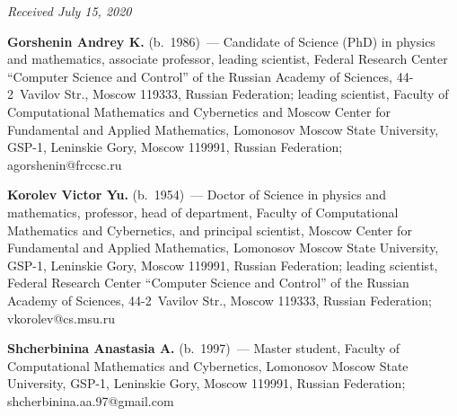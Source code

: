 \hfill{\small\textit{Received July 15, 2020}}



\Contr

\noindent
\textbf{Gorshenin Andrey K.} (b.\ 1986)~--- 
Candidate of Science (PhD) in physics and
mathematics, associate professor, leading scientist, Federal 
Research Center ``Computer Science and Control'' of the Russian 
Academy of Sciences, 44-2~Vavilov Str., Moscow 119333, Russian Federation; 
leading scientist, Faculty of Computational Mathematics and Cybernetics 
and Moscow Center for Fundamental and Applied Mathematics, Lomonosov 
Moscow State University, GSP-1, Leninskie Gory, Moscow 119991, 
Russian Federation; \mbox{agorshenin@frccsc.ru}

\vspace*{3pt}

\noindent
\textbf{Korolev Victor Yu.} (b.\ 1954)~--- 
Doctor of Science in physics and
mathematics, professor, head of department, Faculty of Computational 
Mathematics and Cybernetics, and principal scientist, 
Moscow Center for Fundamental and Applied Mathematics, 
Lomonosov Moscow State University, GSP-1, Leninskie Gory, Moscow 
119991, Russian Federation; leading scientist, Federal Research Center 
``Computer Science and Control'' of the Russian Academy of Sciences, 
44-2~Vavilov Str., Moscow 119333, Russian Federation; \mbox{vkorolev@cs.msu.ru}

\vspace*{3pt}

\noindent
\textbf{Shcherbinina Anastasia A.} (b.\ 1997)~--- Master student,  Faculty
of Computational Mathematics and Cybernetics, 
Lomonosov Moscow State University, GSP-1, Leninskie Gory, 
Moscow 119991, Russian Federation; \mbox{shcherbinina.aa.97@gmail.com}


\label{end\stat}

\renewcommand{\bibname}{\protect\rm Литература} 